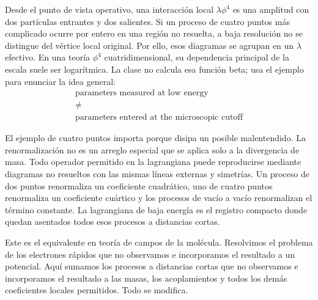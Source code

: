 Desde el punto de vista operativo, una interacción local \(\lambda\phi^4\) es una amplitud con dos partículas entrantes y dos salientes. Si un proceso de cuatro puntos más complicado ocurre por entero en una región no resuelta, a baja resolución no se distingue del vértice local original. Por ello, esos diagramas se agrupan en un \(\lambda\) efectivo. En una teoría \(\phi^4\) cuatridimensional, su dependencia principal de la escala suele ser logarítmica. La clase no calcula esa función beta; usa el ejemplo para enunciar la idea general:
\begin{equation}
\begin{gathered}
\text{parameters measured at low energy}\\
\ne\\
\text{parameters entered at the microscopic cutoff}
\end{gathered}
\end{equation}

El ejemplo de cuatro puntos importa porque disipa un posible malentendido. La renormalización no es un arreglo especial que se aplica solo a la divergencia de masa. Todo operador permitido en la lagrangiana puede reproducirse mediante diagramas no resueltos con las mismas líneas externas y simetrías. Un proceso de dos puntos renormaliza un coeficiente cuadrático, uno de cuatro puntos renormaliza un coeficiente cuártico y los procesos de vacío a vacío renormalizan el término constante. La lagrangiana de baja energía es el registro compacto donde quedan asentados todos esos procesos a distancias cortas.

\begin{classroomqa}
\end{classroomqa}

Este es el equivalente en teoría de campos de la molécula. Resolvimos el problema de los electrones rápidos que no observamos e incorporamos el resultado a un potencial. Aquí sumamos los procesos a distancias cortas que no observamos e incorporamos el resultado a las masas, los acoplamientos y todos los demás coeficientes locales permitidos. Todo se modifica.

